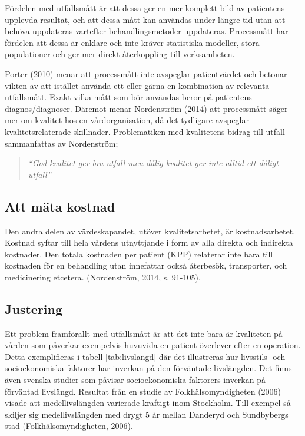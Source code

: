Fördelen med utfallsmått är att dessa ger en mer komplett bild av patientens upplevda resultat, och att dessa mått kan användas under längre tid utan att behöva uppdateras vartefter behandlingsmetoder  uppdateras. Processmått har fördelen att dessa är enklare och inte kräver statistiska modeller, stora populationer och ger mer direkt återkoppling till verksamheten. 
 
Porter (2010) menar att processmått inte avspeglar patientvärdet och betonar vikten av att istället använda ett eller gärna en kombination av relevanta utfallsmått. Exakt vilka mått som bör användas beror på patientens diagnos/diagnoser. Däremot menar Nordenström (2014) att processmått säger mer om kvalitet hos en vårdorganisation, då det tydligare avspeglar kvalitetsrelaterade skillnader. Problematiken med kvalitetens bidrag till utfall sammanfattas av Nordenström;
\begin{quotation}
\textit{“God kvalitet ger bra utfall men dålig kvalitet ger inte alltid ett dåligt utfall”}
\end{quotation}

\subsection{Att mäta kostnad}

Den andra delen av värdeskapandet, utöver kvalitetsarbetet, är kostnadsarbetet.
Kostnad syftar till hela vårdens utnyttjande i form av alla direkta och
indirekta kostnader. Den totala kostnaden per patient (KPP) relaterar inte bara
till kostnaden för en behandling utan innefattar också återbesök, transporter,
och medicinering etcetera. (Nordenström, 2014, s. 91-105).

\subsection{Justering}

Ett problem framförallt med utfallsmått är att det inte bara är kvaliteten på
vården som påverkar exempelvis huvuvida en patient överlever efter en operation.
Detta exemplifieras i tabell \ref{tab:livslangd} där det illustreras hur
livsstils- och socioekonomiska faktorer har inverkan på den förväntade
livslängden. Det finns även svenska studier som påvisar socioekonomiska
faktorers inverkan på förväntad livslängd. Resultat från en studie av
Folkhälsomyndigheten (2006) visade att medellivslängden varierade kraftigt inom
Stockholm. Till exempel så skiljer sig medellivslängden med drygt 5 år mellan
Danderyd och Sundbybergs stad (Folkhälsomyndigheten, 2006).

